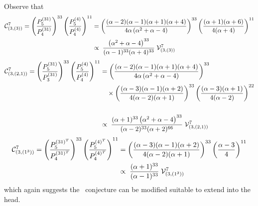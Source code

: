 Observe that
\begin{align*}
{\mathcal C}^{7}_{(3,(3))} = 
\left( \frac{ P^{(31)}_{5}}{P^{(31)}_{4}} \right)^{33} 
\left( \frac{ P^{(4)}_{5}}{P^{(4)}_{4}} \right)^{11} 
&=  \left( \frac{(\alpha -2) (\alpha -1) (\alpha +1) (\alpha +4)}{4 \alpha  \left(\alpha ^2+\alpha -4\right)}  \right)^{33} 
\left( \frac{(\alpha +1) (\alpha +6)}{4 (\alpha +4)}\right)^{11} 
\\
&\propto \; \frac{\left(\alpha ^2+\alpha -4\right)^{33}}{(\alpha -1)^{33} (\alpha +4)^{33}} \; {\mathcal V}^7_{(3,(3))}
\end{align*}
\begin{align*}
{\mathcal C}^{7}_{(3,(2,1))} = 
\left( \frac{ P^{(31)}_{5}}{P^{(31)}_{3}} \right)^{33} 
\left( \frac{ P^{(4)}_{5}}{P^{(4)}_{4}} \right)^{11} 
&= \left( \frac{(\alpha -2) (\alpha -1) (\alpha +1) (\alpha +4)}{4 \alpha  \left(\alpha ^2+\alpha -4\right)}  \right)^{33}\\
&\quad \times \left(\frac{(\alpha -3) (\alpha -1) (\alpha +2)}{4 (\alpha -2) (\alpha +1)}\right)^{33}\left(\frac{(\alpha -3) (\alpha +1)}{4 (\alpha -2)}\right)^{22}\\ 
\\
&\propto \; \frac{ (\alpha +1)^{33} \left(\alpha ^2+\alpha -4\right)^{33}}{(\alpha -2)^{33} (\alpha +2)^{66}} \; {\mathcal V}^7_{(3,(2,1))}
\end{align*}
\begin{align*}
{\mathcal C}^{7}_{(3,(1^3))} = 
\left( \frac{ P^{(31)^T}_{5}}{P^{(31)^T}_{4}} \right)^{33} 
\left( \frac{ P^{(4)^T}_{5}}{P^{(4)^T}_{4}} \right)^{11} 
&=  \left( \frac{(\alpha -3) (\alpha -1) (\alpha +2)}{4 (\alpha -2) (\alpha +1)}  \right)^{33} 
\left( \frac{\alpha -3}{4}\right)^{11} 
\\
&\propto \; \frac{(\alpha+1)^{33}}{(\alpha-1)^{33}} \; {\mathcal V}^7_{(3,(1^3))}
\end{align*}
which again suggests the \ournotmain\ conjecture can be modified suitable to extend into the head.